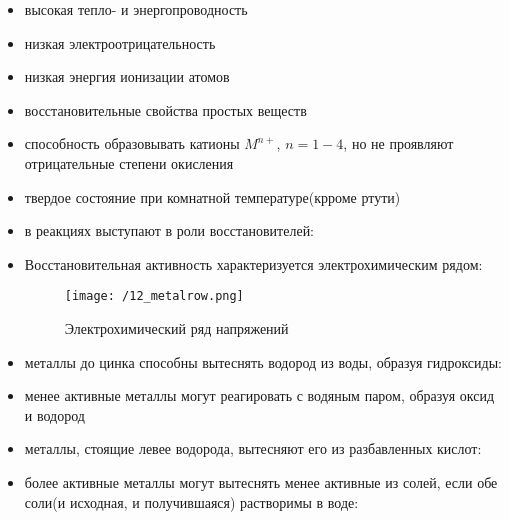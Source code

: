 \begin{itemize}
    \item высокая тепло- и энергопроводность
    \item низкая электроотрицательность
    \item низкая энергия ионизации атомов
    \item восстановительные свойства простых веществ
    \item способность образовывать катионы $M^{n+}$, $n = 1-4$, но не проявляют отрицательные степени окисления
    \item твердое состояние при комнатной температуре(крроме ртути)
    \item в реакциях выступают в роли восстановителей:
    
    
    
    \item Восстановительная активность характеризуется электрохимическим рядом:
    
    \begin{figure}[H]
        \centering
        \texttt{[image: /12\_metalrow.png]}
        \caption{Электрохимический ряд напряжений}
        \label{fig:12row_metal}
    \end{figure}
    
    \item металлы до цинка способны вытеснять водород из воды, образуя гидроксиды:
    
    
    \item менее активные металлы могут реагировать с водяным паром, образуя оксид и водород
    
    
    \item металлы, стоящие левее водорода, вытесняют его из разбавленных кислот:
    
    
    \item более активные металлы могут вытеснять менее активные из солей, если обе соли(и исходная, и получившаяся) растворимы в воде:
    
    
    
\end{itemize} 
